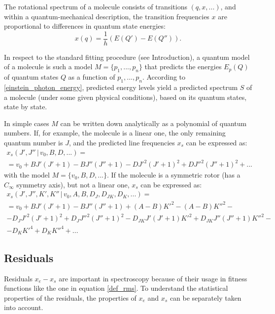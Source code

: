 \documentclass[11pt]{article}
\begin{document}
The rotational spectrum of a molecule consists of transitions $(q, x, ...)$, and within a quantum-mechanical description, the transition frequencies $x$ are proportional to differences in quantum state energies:
\begin{equation} 
\label{einstein_photon_energy}
 x(q) = \frac{1}{h}(E(Q') - E(Q'')).
\end{equation} 

In respect to the standard fitting procedure (see Introduction), a quantum model of a molecule is such a model $M = \{p_1, ..., p_n\}$ that predicts the energies $E_p(Q)$ of quantum states $Q$ as a function of $p_1, ..., p_n$. According to \ref{einstein_photon_energy}, predicted energy levels yield a predicted spectrum $S$ of a molecule (under some given physical conditions), based on its quantum states, state by state. 

In simple cases $M$ can be written down analytically as a polynomial of quantum numbers. If, for example, the molecule is a linear one, the only remaining quantum number is $J$, and the predicted line frequencies $x_s$ can be expressed as:
\begin{multline}
\label{linear_eigenvalues}
x_s(J', J''\, |\, v_0, B, D, ...) = \\
= v_0 + BJ'(J'+1) - BJ''(J''+1) - D{J'}^2(J'+1)^2 + D{J''}^2(J''+1)^2 + ... 
\end{multline}
with the model $M = \{v_0, B, D, ...\}$. If the molecule is a symmetric rotor (has a $C_{\infty}$ symmetry axis), but not a linear one, $x_s$ can be expressed as:
\begin{multline}
\label{sym_eigenvalues}
x_s(J', J'', K', K''\, |\, v_0, A, B, D_J, D_{JK}, D_K, ...) = \\ =
v_0 + BJ'(J'+1) - BJ''(J''+1) + (A - B){K'}^2 - (A - B){K''}^2 - \\
- D_J{J'}^2(J'+1)^2 + D_J{J''}^2(J''+1)^2 - D_{JK}{J'}(J'+1){K'}^2 + D_{JK}{J''}(J''+1){K''}^2 - \\ - D_K{K'}^4 + D_K{K''}^4 + ...
\end{multline}



\subsection{Residuals}

Residuals $x_e - x_s$ are important in spectroscopy because of their usage in fitness functions like the one in equation \ref{def_rms}. To understand the statistical properties of the residuals, the properties of $x_e$ and $x_s$ can be separately taken into account. 
\end{document}
